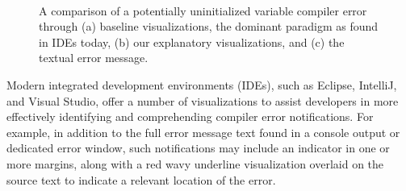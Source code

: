 \documentclass[conference]{IEEEtran}
\begin{document}
\begin{figure}[!t]
  \\
  \caption{A comparison of a potentially uninitialized variable compiler error through (a) baseline visualizations, the dominant paradigm as found in IDEs today, (b) our explanatory visualizations, and (c) the textual error message.\label{fig:melon}}
\end{figure}

Modern integrated development environments (IDEs), such as Eclipse, IntelliJ, and Visual Studio, offer a number of visualizations to assist developers in more effectively identifying and comprehending compiler error notifications. For example, in addition to the full error message text found in a console output or dedicated error window, such notifications may include an indicator in one or more margins, along with a red wavy underline visualization overlaid on the source text to indicate a relevant location of the error.
\end{document}
